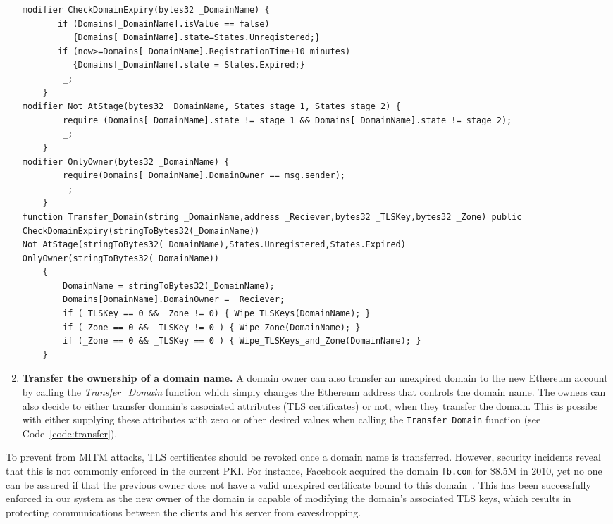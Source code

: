 \begin{enumerate}
\begin{lstlisting}[basicstyle=\scriptsize\ttfamily,caption={\texttt{Transfer\_Domain} function of  \Ghazal smart contract.}, label={code:transfer}]
modifier CheckDomainExpiry(bytes32 _DomainName) {
       if (Domains[_DomainName].isValue == false) 
          {Domains[_DomainName].state=States.Unregistered;} 
       if (now>=Domains[_DomainName].RegistrationTime+10 minutes)
          {Domains[_DomainName].state = States.Expired;} 
        _;
    }
modifier Not_AtStage(bytes32 _DomainName, States stage_1, States stage_2) {
        require (Domains[_DomainName].state != stage_1 && Domains[_DomainName].state != stage_2);
        _;
    }
modifier OnlyOwner(bytes32 _DomainName) {
        require(Domains[_DomainName].DomainOwner == msg.sender);
        _;
    }        
function Transfer_Domain(string _DomainName,address _Reciever,bytes32 _TLSKey,bytes32 _Zone) public 
CheckDomainExpiry(stringToBytes32(_DomainName)) 
Not_AtStage(stringToBytes32(_DomainName),States.Unregistered,States.Expired) 
OnlyOwner(stringToBytes32(_DomainName))
    {
        DomainName = stringToBytes32(_DomainName);
        Domains[DomainName].DomainOwner = _Reciever;
        if (_TLSKey == 0 && _Zone != 0) { Wipe_TLSKeys(DomainName); }
        if (_Zone == 0 && _TLSKey != 0 ) { Wipe_Zone(DomainName); }
        if (_Zone == 0 && _TLSKey == 0 ) { Wipe_TLSKeys_and_Zone(DomainName); }
    }
\end{lstlisting}

\item \textbf{Transfer the ownership of a domain name.} A domain owner can also transfer an unexpired domain to the new Ethereum account by calling the \textit{Transfer\_Domain} function which simply changes the Ethereum address that controls the domain name. The owners can also decide to either transfer domain's associated attributes (\eg TLS certificates) or not, when they transfer the domain. This is possibe with either supplying these attributes with zero or other desired values when calling the \texttt{Transfer\_Domain} function (see Code~\ref{code:transfer}).

\end{enumerate}

To prevent from MITM attacks, TLS certificates should be revoked once a domain name is transferred. However, security incidents reveal that this is not commonly enforced in the current PKI. For instance, Facebook acquired the domain \texttt{fb.com} for \$8.5M in 2010, yet no one can be assured if that the previous owner does not have a valid unexpired certificate bound to this domain~\cite{CO13}. This has been successfully enforced in our system as the new owner of the domain is capable of modifying the domain's associated TLS keys, which results in protecting communications between the clients and his server from eavesdropping.

